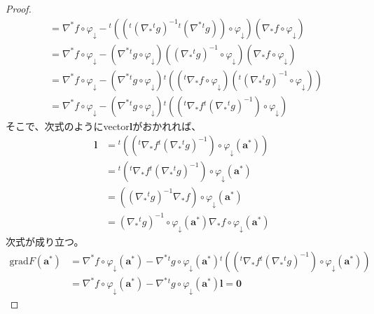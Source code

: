 \documentclass[dvipdfmx]{jsarticle}
\begin{document}
\begin{proof}
\begin{align*}
&= \nabla^{*}f \circ \varphi_{\downarrow} -{}^t \left( \left({}^t \left( \nabla_{*}{}^t g \right)^{- 1}{}^t \left( \nabla^{*}{}^t g \right) \right) \circ \varphi_{\downarrow} \right)\left( \nabla_{*}f \circ \varphi_{\downarrow} \right)\\
&= \nabla^{*}f \circ \varphi_{\downarrow} - \left( \nabla^{*}{}^t g \circ \varphi_{\downarrow} \right)\left( \left( \nabla_{*}{}^t g \right)^{- 1} \circ \varphi_{\downarrow} \right)\left( \nabla_{*}f \circ \varphi_{\downarrow} \right)\\
&= \nabla^{*}f \circ \varphi_{\downarrow} - \left( \nabla^{*}{}^t g \circ \varphi_{\downarrow} \right){}^t \left( \left({}^t \nabla_{*}f \circ \varphi_{\downarrow} \right)\left({}^t \left( \nabla_{*}{}^{t}g \right)^{- 1} \circ \varphi_{\downarrow} \right) \right)\\
&= \nabla^{*}f \circ \varphi_{\downarrow} - \left( \nabla^{*}{}^t g \circ \varphi_{\downarrow} \right){}^t \left( \left({}^t \nabla_{*}f{}^t \left( \nabla_{*}{}^{t}g \right)^{- 1} \right) \circ \varphi_{\downarrow} \right)
\end{align*}
そこで、次式のようにvector$\mathbf{l}$がおかれれば、
\begin{align*}
\mathbf{l} &={}^t \left( \left({}^t \nabla_{*}f{}^t \left( \nabla_{*}{}^{t}g \right)^{- 1} \right) \circ \varphi_{\downarrow}\left( \mathbf{a}^{*} \right) \right)\\
&={}^t \left({}^t \nabla_{*}f{}^t \left( \nabla_{*}{}^{t}g \right)^{- 1} \right) \circ \varphi_{\downarrow}\left( \mathbf{a}^{*} \right)\\
&= \left( \left( \nabla_{*}{}^t g \right)^{- 1}\nabla_{*}f \right) \circ \varphi_{\downarrow}\left( \mathbf{a}^{*} \right)\\
&= \left( \nabla_{*}{}^t g \right)^{- 1} \circ \varphi_{\downarrow}\left( \mathbf{a}^{*} \right)\nabla_{*}f \circ \varphi_{\downarrow}\left( \mathbf{a}^{*} \right)
\end{align*}
次式が成り立つ。
\begin{align*}
\mathrm{grad}F\left( \mathbf{a}^{*} \right) &= \nabla^{*}f \circ \varphi_{\downarrow}\left( \mathbf{a}^{*} \right) - \nabla^{*}{}^t g \circ \varphi_{\downarrow}\left( \mathbf{a}^{*} \right){}^t \left( \left({}^t \nabla_{*}f{}^t \left( \nabla_{*}{}^t g \right)^{- 1} \right) \circ \varphi_{\downarrow}\left( \mathbf{a}^{*} \right) \right)\\
&= \nabla^{*}f \circ \varphi_{\downarrow}\left( \mathbf{a}^{*} \right) - \nabla^{*}{}^t g \circ \varphi_{\downarrow}\left( \mathbf{a}^{*} \right)\mathbf{l} = \mathbf{0}

\end{align*}
\end{proof}
\end{document}
